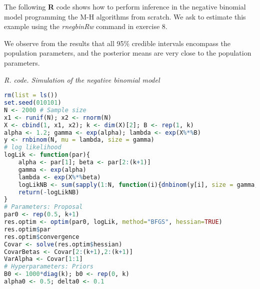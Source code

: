 The following \textbf{R} code shows how to perform inference in the negative binomial model programming the M-H algorithms from scratch. We ask to estimate this example using the \textit{rnegbinRw} command in exercise 8.

We observe from the results that all 95\% credible intervals encompass the population parameters, and the posterior means are very close to the population parameters.

\begin{tcolorbox}[enhanced,width=4.67in,center upper,
	fontupper=\large\bfseries,drop shadow southwest,sharp corners]
	\textit{R. code. Simulation of the negative binomial model}
	\begin{VF}
		\begin{lstlisting}[language=R]
rm(list = ls())
set.seed(010101)
N <- 2000 # Sample size
x1 <- runif(N); x2 <- rnorm(N)
X <- cbind(1, x1, x2); k <- dim(X)[2]; B <- rep(1, k)
alpha <- 1.2; gamma <- exp(alpha); lambda <- exp(X%*%B)
y <- rnbinom(N, mu = lambda, size = gamma)
# log likelihood
logLik <- function(par){
	alpha <- par[1]; beta <- par[2:(k+1)]
	gamma <- exp(alpha)
	lambda <- exp(X%*%beta)
	logLikNB <- sum(sapply(1:N, function(i){dnbinom(y[i], size = gamma, mu = lambda[i], log = TRUE)}))
	return(-logLikNB)
}
# Parameters: Proposal
par0 <- rep(0.5, k+1)
res.optim <- optim(par0, logLik, method="BFGS", hessian=TRUE)
res.optim$par
res.optim$convergence
Covar <- solve(res.optim$hessian) 
CovarBetas <- Covar[2:(k+1),2:(k+1)]
VarAlpha <- Covar[1:1]
# Hyperparameters: Priors
B0 <- 1000*diag(k); b0 <- rep(0, k)
alpha0 <- 0.5; delta0 <- 0.1
\end{lstlisting}
	\end{VF}
\end{tcolorbox} 

